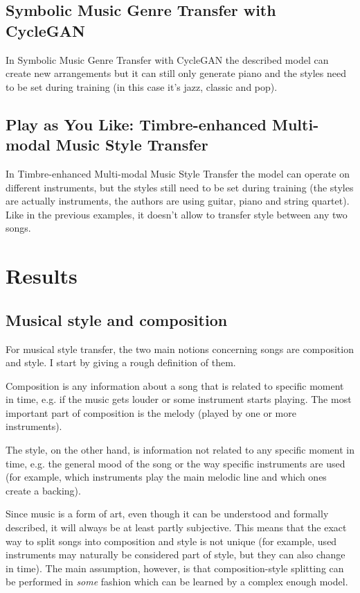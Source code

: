 \documentclass[en]{pracamgr}
\begin{document}
\section{Symbolic Music Genre Transfer with CycleGAN}

In Symbolic Music Genre Transfer with CycleGAN \cite{cyclegan} the described model can create new arrangements but it can still only generate piano and the styles need to be set during training (in this case it's jazz, classic and pop).

\section{Play as You Like: Timbre-enhanced Multi-modal Music Style Transfer}

In Timbre-enhanced Multi-modal Music Style Transfer \cite{multimodal} the model can operate on different instruments, but the styles still need to be set during training (the styles are actually instruments, the authors are using guitar, piano and string quartet).
Like in the previous examples, it doesn't allow to transfer style between any two songs.

\chapter{Results}

\section{Musical style and composition}

For musical style transfer, the two main notions concerning songs are composition and style.
I start by giving a rough definition of them.

Composition is any information about a song that is related to specific moment in time, e.g. if the music gets louder or some instrument starts playing.
The most important part of composition is the melody (played by one or more instruments).

The style, on the other hand, is information not related to any specific moment in time, e.g. the general mood of the song or the way specific instruments are used (for example, which instruments play the main melodic line and which ones create a backing).

Since music is a form of art, even though it can be understood and formally described, it will always be at least partly subjective.
This means that the exact way to split songs into composition and style is not unique (for example, used instruments may naturally be considered part of style, but they can also change in time).
The main assumption, however, is that composition-style splitting can be performed in \emph{some} fashion which can be learned by a complex enough model.
\end{document}
